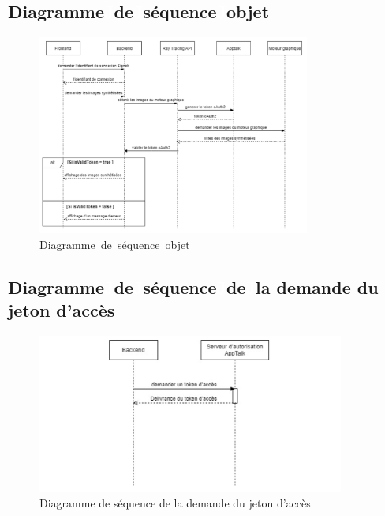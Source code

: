 \subsection{Diagramme\textcolor{white}{J}de\textcolor{white}{J}séquence\textcolor{white}{J}objet}
\begin{figure}[!ht]\centering
\includegraphics[width=0.8\textwidth,angle=00]{chapitres/chapitre4/figures/Seq-Chap4.png}
\caption{Diagramme\textcolor{white}{J}de\textcolor{white}{J}séquence\textcolor{white}{J}objet
}
\label{fig:schemaSourcin}
\end{figure}


\subsection{Diagramme\textcolor{white}{J}de\textcolor{white}{J}séquence\textcolor{white}{J}de\textcolor{white}{J}la demande du jeton d’accès}
\begin{figure}[!ht]\centering
\includegraphics[width=0.9\textwidth,angle=00]{chapitres/chapitre4/figures/SeqDemande-Chap4.png}
\caption{Diagramme de séquence de la demande du jeton d’accès}
\label{fig:schemaSourcin}
\end{figure}

